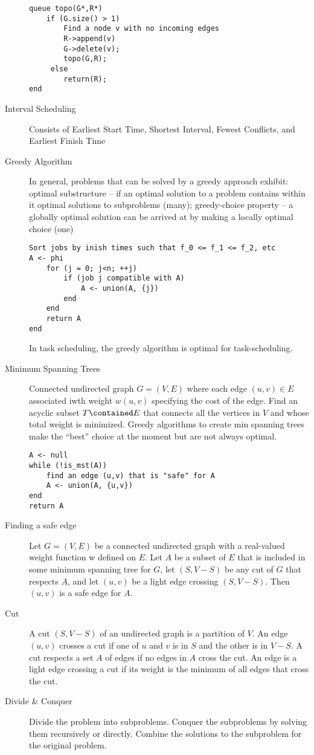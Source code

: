 \documentclass[8pt]{article}
\begin{document}
\begin{multicols}{2}
\begin{description}
\begin{verbatim}
queue topo(G*,R*)
    if (G.size() > 1)
        Find a node v with no incoming edges
        R->append(v)
        G->delete(v);
        topo(G,R);
     else
        return(R);
end
\end{verbatim}
  \item[Interval Scheduling] Consists of Earliest Start Time, Shortest
    Interval, Fewest Conflicts, and Earliest Finish Time
  \item[Greedy Algorithm] In general, problems that can be solved by a
    greedy approach exhibit: optimal substructure -- if an optimal
    solution to a problem contains within it optimal solutions to
    subproblems (many); greedy-choice property -- a globally optimal
    solution can be arrived at by making a locally optimal choice
    (one)
\begin{verbatim}
Sort jobs by inish times such that f_0 <= f_1 <= f_2, etc
A <- phi
    for (j = 0; j<n; ++j)
        if (job j compatible with A)
            A <- union(A, {j})
        end
    end
    return A
end
\end{verbatim}
In task scheduling, the greedy algorithm is optimal for task-scheduling.
\item[Minimum Spanning Trees] Connected undirected graph $G=(V,E)$
  where each edge $(u,v) \in E$ associated iwth weight $w(u,v)$
  specifying the cost of the edge. Find an acyclic subset $T
  \contained E$ that connects all the vertices in $V$ and whose total
  weight is minimized. Greedy algorithms to create min spanning trees
  make the ``best'' choice at the moment but are not always optimal.
\begin{verbatim}
A <- null
while (!is_mst(A))
    find an edge (u,v) that is "safe" for A
    A <- union(A, {u,v})
end
return A
\end{verbatim}
\item[Finding a safe edge] Let $G = (V, E)$ be a connected undirected
  graph with a real-valued weight function w defined on $E$. Let $A$
  be a subset of $E$ that is included in some minimum spanning tree
  for $G$, let $(S, V − S)$ be any cut of $G$ that respects $A$, and
  let $(u, v)$ be a light edge crossing $(S, V − S)$. Then $(u, v)$ is
  a safe edge for $A$.
\item[Cut] A cut $(S,V-S)$ of an undirected graph is a partition of
  $V$. An edge $(u,v)$ crosses a cut if one of $u$ and $v$ is in $S$
  and the other is in $V-S$. A cut respects a set $A$ of edges if no
  edges in $A$ cross the cut. An edge is a light edge crossing a cut
  if its weight is the minimum of all edges that cross the cut.
\item[Divide \& Conquer] Divide the problem into subproblems. Conquer
  the subproblems by solving them recursively or directly. Combine the
  solutions to the subproblem for the original problem.
  \end{description} %
\end{multicols}
\end{document}
